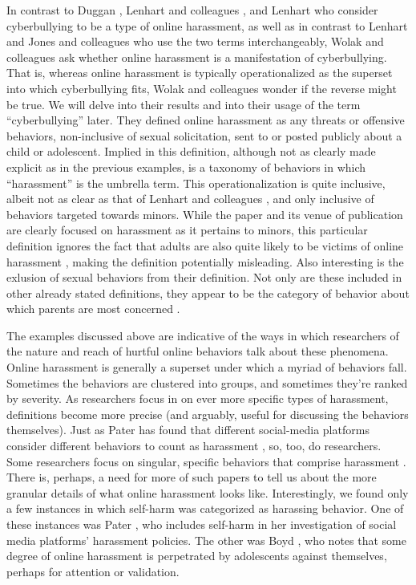 \documentclass{sigchi}
\begin{document}
In contrast to Duggan \cite{Duggan2014Online}, Lenhart and colleagues \cite{Lenhart2016Online}, and Lenhart \cite{Lenhart2010Cyberbullying} who consider cyberbullying to be a type of online harassment, as well as in contrast to Lenhart \cite{Lenhart2007Cyberbullying} and Jones and colleagues \cite{Jones2013Online} who use the two terms interchangeably, Wolak and colleagues \cite{Wolak2007Does} ask whether online harassment is a manifestation of cyberbullying.  That is, whereas online harassment is typically operationalized as the superset into which cyberbullying fits, Wolak and colleagues wonder if the reverse might be true.  We will delve into their results and into their usage of the term ``cyberbullying'' later.  They defined online harassment as any threats or offensive behaviors, non-inclusive of sexual solicitation, sent to or posted publicly about a child or adolescent.  Implied in this definition, although not as clearly made explicit as in the previous examples, is a taxonomy of behaviors in which ``harassment'' is the umbrella term.  This operationalization is quite inclusive, albeit not as clear as that of Lenhart and colleagues \cite{Lenhart2016Online}, and only inclusive of behaviors targeted towards minors.  While the paper and its venue of publication are clearly focused on harassment as it pertains to minors, this particular definition ignores the fact that adults are also quite likely to be victims of online harassment \cite{Duggan2014Online,Lenhart2016Online}, making the definition potentially misleading.  Also interesting is the exlusion of sexual behaviors from their definition.  Not only are these included in other already stated definitions, they appear to be the category of behavior about which parents are most concerned \cite{Davis2015Parents}.

The examples discussed above are indicative of the ways in which researchers of the nature and reach of hurtful online behaviors talk about these phenomena.  Online harassment is generally a superset under which a myriad of behaviors fall.  Sometimes the behaviors are clustered into groups, and sometimes they're ranked by severity.  As researchers focus in on ever more specific types of harassment, definitions become more precise (and arguably, useful for discussing the behaviors themselves).  Just as Pater has found that different social-media platforms consider different behaviors to count as harassment \cite{Pater2016Characterizations}, so, too, do researchers.  Some researchers focus on singular, specific behaviors that comprise harassment \cite{Moor2010Flaming}.  There is, perhaps, a need for more of such papers to tell us about the more granular details of what online harassment looks like.  Interestingly, we found only a few instances in which self-harm was categorized as harassing behavior.  One of these instances was Pater \cite{Pater2016Characterizations}, who includes self-harm in her investigation of social media platforms' harassment policies.  The other was Boyd \cite{Boyd2014Bullying}, who notes that some degree of online harassment is perpetrated by adolescents against themselves, perhaps for attention or validation.
\end{document}
